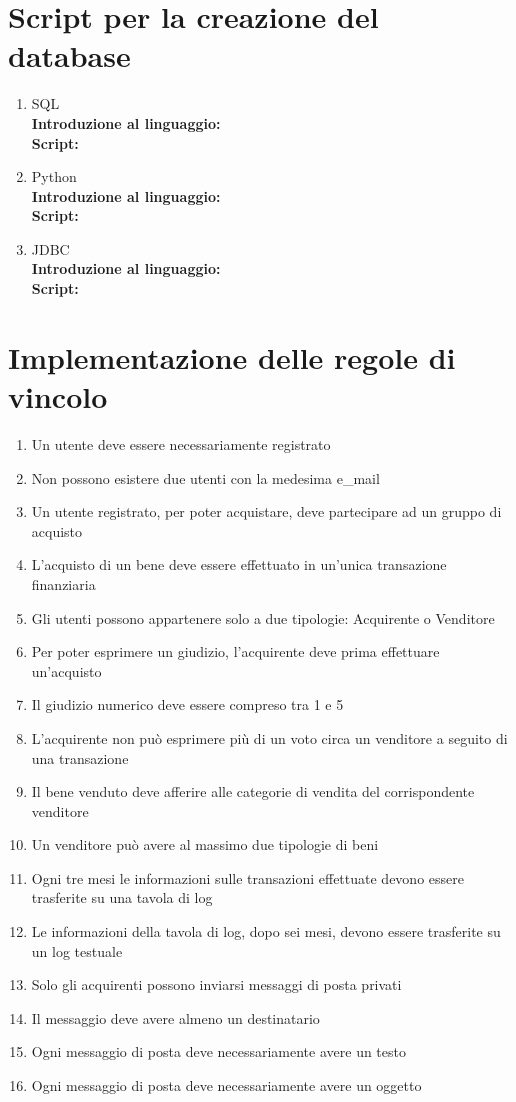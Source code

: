 \documentclass[a4paper, 10pt]{report}
\begin{document}
\chapter{Script per la creazione del database}
\begin{enumerate}
\item SQL \\
\textbf{Introduzione al linguaggio:}\\
\textbf{Script:}\\

\item Python\\
\textbf{Introduzione al linguaggio:}\\
\textbf{Script:}\\

\item JDBC\\
\textbf{Introduzione al linguaggio:}\\
\textbf{Script:}\\
\end{enumerate}

\chapter{Implementazione delle regole di vincolo}
\begin{enumerate}
\item Un utente deve essere necessariamente registrato
\item Non possono esistere due utenti con la medesima e\_mail
\item Un utente registrato, per poter acquistare, deve partecipare ad un gruppo di acquisto
\item L'acquisto di un bene deve essere effettuato in un'unica transazione finanziaria
\item Gli utenti possono appartenere solo a due tipologie: Acquirente o Venditore
\item Per poter esprimere un giudizio, l'acquirente deve prima effettuare un'acquisto
\item Il giudizio numerico deve essere compreso tra 1 e 5
\item L'acquirente non pu\`o esprimere pi\`u di un voto circa un venditore a seguito di una transazione
\item Il bene venduto deve afferire alle categorie di vendita del corrispondente venditore
\item Un venditore pu\`o avere al massimo due tipologie di beni
\item Ogni tre mesi le informazioni sulle transazioni effettuate devono essere trasferite su una tavola di log
\item Le informazioni della tavola di log, dopo sei mesi, devono essere trasferite su un log testuale
\item Solo gli acquirenti possono inviarsi messaggi di posta privati
\item Il messaggio deve avere almeno un destinatario
\item Ogni messaggio di posta deve necessariamente avere un testo
\item Ogni messaggio di posta deve necessariamente avere un oggetto
\end{enumerate}
\end{document}
